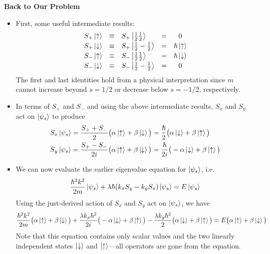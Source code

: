 \documentclass[11pt, a4paper]{article}
\newcommand{\p}{\psi}  %
\newcommand{\ua}{\uparrow}  %
\newcommand{\da}{\downarrow}  %
\begin{document}
\textbf{Back to Our Problem}
\begin{itemize}
	\item  First, some useful intermediate results:
	\[
	\begin{array}{cclcc}
		 S_{+}\ket{\ua} & \equiv & S_{+}\ket{\tfrac{1}{2} \tfrac{1}{2}} & = & 0\\[0.2em]
		 S_{+}\ket{\da} & \equiv &S_{+}\ket{\tfrac{1}{2} -\tfrac{1}{2}} & = & \hbar \ket{\ua}\\[0.2em]
		 S_{-}\ket{\ua} & \equiv & S_{-}\ket{\tfrac{1}{2} \tfrac{1}{2}} & = & \hbar \ket{\da}\\[0.2em]
		 S_{-}\ket{\da} & \equiv & S_{-}\ket{\tfrac{1}{2}- \tfrac{1}{2}} & = & 0
	\end{array}
	\]
	The first and last identities hold from a physical interpretation since $ m $ cannot increase beyond $ s = 1/2 $ or decrease below $ s = -1/2$, respectively.

	\item In terms of $ S_{+} $ and $ S_{-} $ and using the above intermediate results, $ S_{x} $ and $ S_{y} $ act on $ \ket{\psi_{s}} $ to produce
	\begin{align*}
		&S_{x}\ket{\psi_{s}} = \frac{S_{+}+S_{-}}{2} \big(\alpha \ket{\ua} + \beta \ket{\da}\big) = \frac{\hbar}{2} \big(\alpha \ket{\da} + \beta \ket{\ua}\big)\\
		&S_{y}\ket{\psi_{s}} = \frac{S_{+}-S_{-}}{2i} \big(\alpha \ket{\ua} + \beta \ket{\da}\big) = \frac{\hbar}{2i} \big(-\alpha \ket{\da} + \beta \ket{\ua}\big)
	\end{align*} 
	
	\item We can now evaluate the earlier eigenvalue equation for $ \ket{\p_{s}} $, i.e.
	\begin{equation*}
		\frac{\hbar^{2}k^{2}}{2m}\ket{\psi_{s}} + \lambda \hbar (k_{x}S_{y} - k_{y}S_{x})\ket{\psi_{s}} = E\ket{\psi_{s}}
	\end{equation*}
	Using the just-derived action of $ S_{x} $ and $ S_{y} $ act on $ \ket{\psi_{s}} $, we have
	\begin{equation*}
		\frac{\hbar^{2}k^{2}}{2m}\big(\alpha \ket{\ua} + \beta \ket{\da}\big)+ \frac{\lambda k_{x} \hbar^{2}}{2i} \big(-\alpha \ket{\da} + \beta \ket{\ua}\big) - \frac{\lambda k_{y} \hbar^{2}}{2} \big(\alpha \ket{\da} + \beta \ket{\ua}\big) = E\big(\alpha \ket{\ua} + \beta \ket{\da}\big)
	\end{equation*}
	Note that this equation contains only scalar values and the two linearly independent states $ \ket{\da} $ and $ \ket{\ua} $---all operators are gone from the equation. 
	

\end{itemize}
\end{document}
